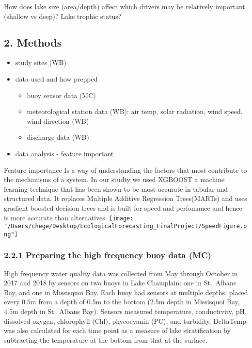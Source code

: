 \documentclass[]{article}
\providecommand{\tightlist}{%
  \setlength{\itemsep}{0pt}\setlength{\parskip}{0pt}}
\begin{document}
How does lake size (area/depth) affect which drivers may be relatively
important (shallow vs deep)? Lake trophic status?

\hypertarget{methods}{%
\subsection{2. Methods}\label{methods}}

\begin{itemize}
\tightlist
\item
  study sites (WB)
\item
  data used and how prepped

  \begin{itemize}
  \tightlist
  \item
    buoy sensor data (MC)
  \item
    meteorological station data (WB): air temp, solar radiation, wind
    speed, wind direction (WB)
  \item
    discharge data (WB)
  \end{itemize}
\item
  data analysis - feature important
\end{itemize}

Feature importance Is a way of understanding the factors that most
contribute to the mechanisms of a system. In our studty we used XGBOOST
a machine learning technique that has been shown to be most accurate in
tabular and structured data. It replaces Multiple Additive Regression
Trees(MARTs) and uses gradient boosted decision trees and is built for
speed and perfomance and hence is more accurate than alternatives.
\texttt{[image: "/Users/chege/Desktop/EcologicalForecasting\_FinalProject/SpeedFigure.png"]}

\hypertarget{preparing-the-high-frequency-buoy-data-mc}{%
\subsubsection{2.2.1 Preparing the high frequency buoy data
(MC)}\label{preparing-the-high-frequency-buoy-data-mc}}

High frequency water quality data was collected from May through October
in 2017 and 2018 by sensors on two buoys in Lake Champlain: one in
St.~Albans Bay, and one in Missisquoi Bay. Each buoy had sensors at
multiple depths, placed every 0.5m from a depth of 0.5m to the bottom
(2.5m depth in Missisquoi Bay, 4.5m depth in St.~Albans Bay). Sensors
measured temperature, conductivity, pH, dissolved oxygen, chlorophyll
(Chl), phycocyanin (PC), and turbidity. DeltaTemp was also calculated
for each time point as a measure of lake stratification by subtracting
the temperature at the bottom from that at the surface.
\end{document}
